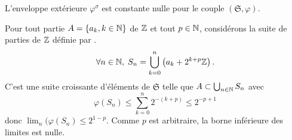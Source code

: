 \begin{exple}[1]
 L'enveloppe extérieure $\varphi^\sigma$ est constante nulle pour le couple $(\mathfrak{S}, \varphi)$.
\end{exple}
\begin{demo}
 Pour tout partie $A = \left\lbrace a_k , k \in \mathbb{N}\right\rbrace$ de $\mathbb{Z}$ et tout $p\in \mathbb{N}$, considérons la suite de parties de $\mathbb{Z}$ définie par .
 \begin{displaymath}
  \forall n \in \mathbb{N}, \; S_n = \bigcup_{k =0}^n \left(a_k + 2^{k+p} \mathbb{Z}\right) .
 \end{displaymath}
 C'est une suite croissante d'éléments de $\mathfrak{S}$ telle que $A \subset \bigcup_{n\in \mathbb{N}}S_n$ avec
 \begin{displaymath}
  \varphi(S_n) \leq \sum_{k=0}^n 2^{-(k+p)} \leq 2^{-p + 1}
 \end{displaymath}
donc  $\lim_n (\varphi(S_n) \leq 2^{1-p}$. Comme $p$ est arbitraire, la borne inférieure des limites est nulle.
\end{demo}

